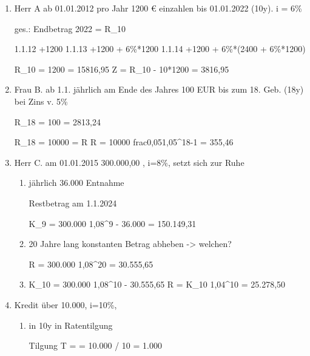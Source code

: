 \documentclass[12pt,a4paper]{scrreprt}
\begin{document}
\begin{enumerate}
\item

Herr A ab 01.01.2012 pro Jahr 1200 € einzahlen bis 01.01.2022 (10y).
i = 6\%

ges.: Endbetrag 2022 = R_10

1.1.12 +1200
1.1.13 +1200 + 6\%*1200
1.1.14 +1200 + 6\%*(2400 + 6\%*1200)

R_10 = 1200  = 15816,95
Z = R_10 - 10*1200 = 3816,95

\item

Frau B. ab 1.1. jährlich am Ende des Jahres
100 EUR bis zum 18. Geb. (18y) bei Zins v. 5\%

R_18 = 100  = 2813,24

R_18 = 10000 = R 
R = 10000 frac{0,05}{1,05^18-1} = 355,46

\item

Herr C. am 01.01.2015 300.000,00 , i=8\%, setzt sich zur Ruhe

\begin{enumerate}

\item jährlich 36.000 Entnahme

Restbetrag am 1.1.2024

K_9 = 300.000 1,08^9 - 36.000  = 150.149,31

\item

20 Jahre lang konstanten Betrag abheben -> welchen?

R = 300.000 1,08^20  = 30.555,65

\item

K_10 = 300.000 1,08^10 - 30.555,65  %
R = K_10 1,04^10  = 25.278,50

\end{enumerate}

\item

Kredit über 10.000, i=10\%, 

\begin{enumerate}
\item in 10y in Ratentilgung

Tilgung T =  = 10.000 / 10 = 1.000


\end{enumerate}
\end{enumerate}
\end{document}
